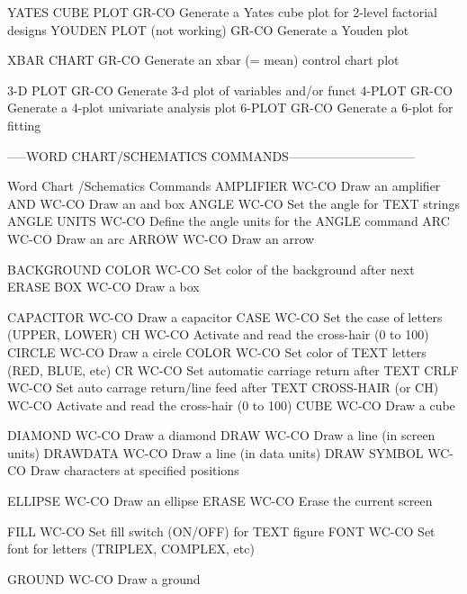 YATES CUBE PLOT             GR-CO Generate a Yates cube plot for 2-level factorial designs
YOUDEN PLOT (not working)   GR-CO Generate a Youden plot

XBAR CHART                  GR-CO Generate an xbar (= mean) control chart plot

3-D PLOT                    GR-CO Generate 3-d plot of variables and/or funct
4-PLOT                      GR-CO Generate a 4-plot univariate analysis plot
6-PLOT                      GR-CO Generate a 6-plot for fitting

-----WORD CHART/SCHEMATICS COMMANDS------------------------------

Word Chart /Schematics Commands
AMPLIFIER                   WC-CO Draw an amplifier
AND                         WC-CO Draw an and box
ANGLE                       WC-CO Set the angle for TEXT strings
ANGLE UNITS                 WC-CO Define the angle units for the ANGLE command
ARC                         WC-CO Draw an arc
ARROW                       WC-CO Draw an arrow

BACKGROUND COLOR            WC-CO Set color of the background after next ERASE
BOX                         WC-CO Draw a box

CAPACITOR                   WC-CO Draw a capacitor
CASE                        WC-CO Set the case of letters (UPPER, LOWER)
CH                          WC-CO Activate and read the cross-hair (0 to 100)
CIRCLE                      WC-CO Draw a circle
COLOR                       WC-CO Set color of TEXT letters (RED, BLUE, etc)
CR                          WC-CO Set automatic carriage return after TEXT
CRLF                        WC-CO Set auto carrage return/line feed after TEXT
CROSS-HAIR (or CH)          WC-CO Activate and read the cross-hair (0 to 100)
CUBE                        WC-CO Draw a cube

DIAMOND                     WC-CO Draw a diamond
DRAW                        WC-CO Draw a line (in screen units)
DRAWDATA                    WC-CO Draw a line (in data units)
DRAW SYMBOL                 WC-CO Draw characters at specified positions

ELLIPSE                     WC-CO Draw an ellipse
ERASE                       WC-CO Erase the current screen

FILL                        WC-CO Set fill switch (ON/OFF) for TEXT figure
FONT                        WC-CO Set font for letters (TRIPLEX, COMPLEX, etc)

GROUND                      WC-CO Draw a ground

